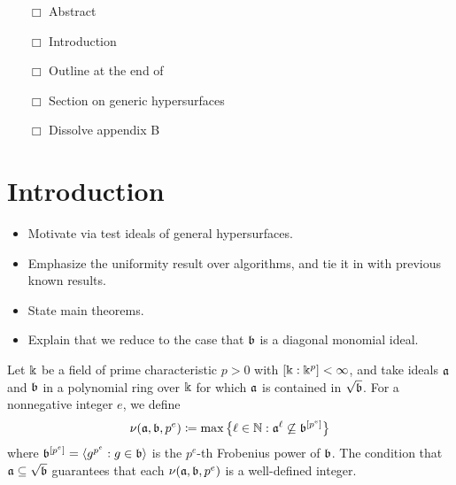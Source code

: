 \documentclass{amsart}
\begin{document}
{\begin{enumerate}
 \item[$\Box$] Abstract
 \item[$\Box$] Introduction
 \item[$\Box$] Outline at the end of 
 \item[$\Box$] Section on generic hypersurfaces
 \item[$\Box$] Dissolve appendix B
   \end{enumerate}
}

\setcounter{tocdepth}{1}
\tableofcontents

\section{Introduction}

\begin{itemize}
 \item Motivate via test ideals of general hypersurfaces.
 \item Emphasize the uniformity result over algorithms, and tie it in with previous known results.
 \item State main theorems.
 \item Explain that we reduce to the case that $\mathfrak{b}$ is a diagonal monomial ideal.
\end{itemize}



Let $\Bbbk$ be a field of prime characteristic $p>0$ with $[\Bbbk:\Bbbk^p] < \infty$, and take ideals $\mathfrak{a}$ and $\mathfrak{b}$ in a polynomial ring over $\Bbbk$ for which $\mathfrak{a}$ is contained in $\sqrt {\mathfrak{b}}$.
For a nonnegative integer $e$, we define
%
\[\nu(\mathfrak{a},\mathfrak{b},p^e) \coloneqq \max\big\{\ell\in \mathbb{N} : \mathfrak{a}^{\ell} \not\subseteq \mathfrak{b}^{[p^e]}\big\}\]
%
where $\mathfrak{b}^{[p^e]} = \langle g^{p^e} : g \in \mathfrak{b} \rangle$ is the $p^e$-th Frobenius power of $\mathfrak{b}$.
The condition that $\mathfrak{a} \subseteq \sqrt {\mathfrak{b}}$ guarantees that each $\nu(\mathfrak{a}, \mathfrak{b}, p^e)$ is a well-defined integer.
\end{document}
